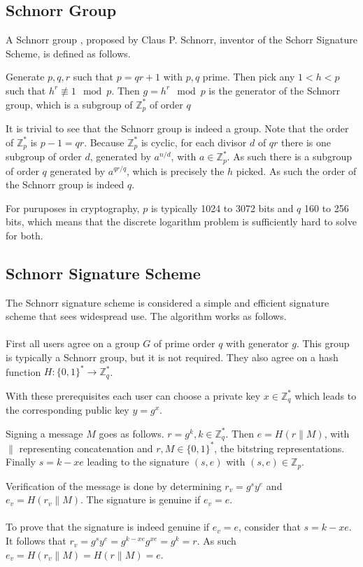 \subsection{Schnorr Group}
A Schnorr group \cite{Schnorr}, proposed by Claus P. Schnorr, inventor of the Schorr Signature Scheme, is defined as follows.
\begin{defn}
	Generate $p,q,r$ such that $p=qr+1$ with $p,q$ prime. Then pick any $1<h<p$ such that $h^r\not\equiv1\mod{p}$. Then $g=h^r\mod{p}$ is the generator of the Schnorr group, which is a subgroup of $\mathbb{Z}_{p}^*$ of order $q$
\end{defn}
\begin{prf}
	It is trivial to see that the Schnorr group is indeed a group. Note that the order of $\mathbb{Z}_{p}^*$ is $p-1=qr$. Because $\mathbb{Z}_{p}^*$ is cyclic, for each divisor $d$ of $qr$ there is one subgroup of order $d$, generated by $a^{n/d}$, with $a\in\mathbb{Z}_{p}^*$. As such there is a subgroup of order $q$ generated by $a^{qr/q}$, which is precisely the $h$ picked. As such the order of the Schnorr group is indeed $q$.
\end{prf}
For puruposes in cryptography, $p$ is typically 1024 to 3072 bits and $q$ 160 to 256 bits, which means that the discrete logarithm problem is sufficiently hard to solve for both.

\subsection{Schnorr Signature Scheme}
The Schnorr signature scheme is considered a simple and efficient signature scheme that sees widespread use. The algorithm works as follows.
\\
\\
First all users agree on a group $G$ of prime order $q$ with generator $g$. This group is typically a Schnorr group, but it is not required. They also agree on a hash function $H: \{0,1\}^*\to\mathbb{Z}_{q}^*$.

With these prerequisites each user can choose a private key $x\in \mathbb{Z}_{q}^*$ which leads to the corresponding public key $y=g^x$.

Signing a message $M$ goes as follows. $r=g^k, k\in \mathbb{Z}_{q}^*$. Then $e=H(r\parallel M)$, with $\parallel$ representing concatenation and $r,M\in \{0,1\}^*$, the bitstring representations. Finally $s=k-xe$ leading to the signature $(s,e)$ with $(s,e)\in \mathbb{Z}_p$.

Verification of the message is done by determining $r_v=g^sy^e$ and $e_v=H(r_v\parallel M)$. The signature is genuine if $e_v=e$.
\\
\\
To prove that the signature is indeed genuine if $e_v=e$, consider that $s=k-xe$. It follows that $r_v=g^sy^e=g^{k-xe}g^{xe}=g^k=r$. As such $e_v=H(r_v\parallel M)=H(r\parallel M)=e$. 

